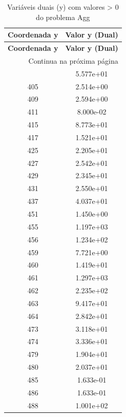 \documentclass[12pt]{article}
\begin{document}
\begin{longtable}{@{}cc@{}}
\caption{Variáveis duais (y) com valores > 0 do problema Agg} \\
\toprule
\textbf{Coordenada y} & \textbf{Valor y (Dual)} \\
\midrule
\endfirsthead

\toprule
\textbf{Coordenada y} & \textbf{Valor y (Dual)} \\
\midrule
\endhead

\midrule \multicolumn{2}{r}{{Continua na próxima página}} \\ \midrule
\endfoot

\bottomrule
\endlastfoot
397 & 5.577e+01 \\
405 & 2.514e+00 \\
409 & 2.594e+00 \\
411 & 8.000e-02 \\
415 & 8.773e+01 \\
417 & 1.521e+01 \\
425 & 2.205e+01 \\
427 & 2.542e+01 \\
429 & 2.345e+01 \\
431 & 2.550e+01 \\
437 & 4.037e+01 \\
451 & 1.450e+00 \\
455 & 1.197e+03 \\
456 & 1.234e+02 \\
459 & 7.721e+00 \\
460 & 1.419e+01 \\
461 & 1.297e+03 \\
462 & 2.235e+02 \\
463 & 9.417e+01 \\
464 & 2.842e+01 \\
473 & 3.118e+01 \\
474 & 3.336e+01 \\
479 & 1.904e+01 \\
480 & 2.037e+01 \\
485 & 1.633e-01 \\
486 & 1.633e-01 \\
488 & 1.001e+02 \\

\bottomrule
\end{longtable}
\end{document}
